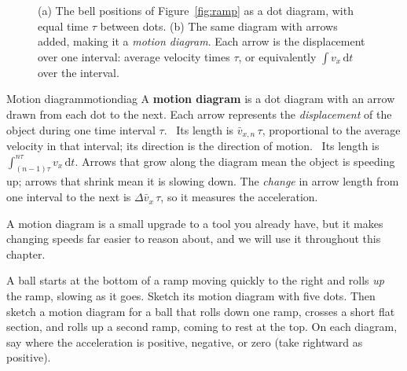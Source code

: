 \documentclass[11pt,twoside,openany]{book}
\newcommand{\dd}{\mathrm{d}}
\newcounter{check}[chapter]
\newcommand{\viewtag}[3]{\fcolorbox{#2}{#3}{\footnotesize\textbf{\textcolor{#2}{#1}}}}
\newcommand{\elemtag}{\viewtag{Elementary}{elemcol}{elempale}}
\newcommand{\calctag}{\viewtag{Calculus}{calccol}{calcpale}}
\begin{document}
\begin{figure}[htb]
\centering
{}
\caption{(a) The bell positions of Figure~\ref{fig:ramp} as a dot diagram, with equal time $\tau$ between dots. (b) The same diagram with arrows added, making it a \emph{motion diagram}. Each arrow is the displacement over one interval: average velocity times $\tau$, or equivalently $\int v_x\,\dd t$ over the interval.}
\label{fig:motiondiag}
\end{figure}

\begin{definition}{Motion diagram}{motiondiag}
A \textbf{motion diagram} is a dot diagram with an arrow drawn from each dot to the next. Each arrow represents the \emph{displacement} of the object during one time interval $\tau$. \elemtag\ Its length is $\bar v_{x,n}\,\tau$, proportional to the average velocity in that interval; its direction is the direction of motion. \calctag\ Its length is $\int_{(n-1)\tau}^{n\tau} v_x\,\dd t$. Arrows that grow along the diagram mean the object is speeding up; arrows that shrink mean it is slowing down. The \emph{change} in arrow length from one interval to the next is $\Delta\bar v_x\,\tau$, so it measures the acceleration.
\end{definition}

A motion diagram is a small upgrade to a tool you already have, but it makes changing speeds far easier to reason about, and we will use it throughout this chapter.

\begin{checkbox}
A ball starts at the bottom of a ramp moving quickly to the right and rolls \emph{up} the ramp, slowing as it goes. Sketch its motion diagram with five dots. Then sketch a motion diagram for a ball that rolls down one ramp, crosses a short flat section, and rolls up a second ramp, coming to rest at the top. On each diagram, say where the acceleration is positive, negative, or zero (take rightward as positive).
\end{checkbox}
\end{document}
